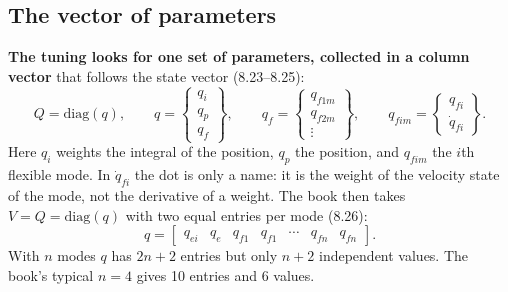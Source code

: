 \documentclass[10pt,a4paper]{article}
\numberwithin{equation}{section}
\begin{document}
\subsection{The vector of parameters}
\textbf{The tuning looks for one set of parameters, collected in a column vector} that follows the state vector (8.23--8.25):
\begin{equation}
Q=\mathrm{diag}(q),\qquad
q=\begin{Bmatrix}q_i\\q_p\\q_f\end{Bmatrix},\qquad
q_f=\begin{Bmatrix}q_{f1m}\\q_{f2m}\\\vdots\end{Bmatrix},\qquad
q_{fim}=\begin{Bmatrix}q_{fi}\\\dot q_{fi}\end{Bmatrix}.
\end{equation}
Here $q_i$ weights the integral of the position, $q_p$ the position, and $q_{fim}$ the $i$th flexible mode. In $\dot q_{fi}$ the dot is only a name: it is the weight of the velocity state of the mode, not the derivative of a weight. The book then takes $V=Q=\mathrm{diag}(q)$ with two equal entries per mode (8.26):
\begin{equation}
q=\begin{bmatrix}q_{ei}&q_e&q_{f1}&q_{f1}&\cdots&q_{fn}&q_{fn}\end{bmatrix}.\tag{8.26}
\end{equation}
With $n$ modes $q$ has $2n+2$ entries but only $n+2$ independent values. The book's typical $n=4$ gives 10 entries and 6 values.
\end{document}
